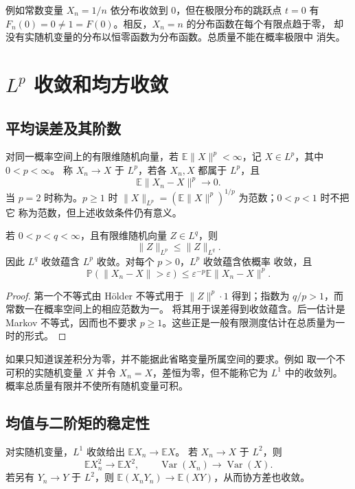 例如常数变量 $X_n=1/n$ 依分布收敛到 $0$，但在极限分布的跳跃点 $t=0$
有 $F_n(0)=0\ne1=F(0)$。相反，$X_n=n$ 的分布函数在每个有限点趋于零，
却没有实随机变量的分布以恒零函数为分布函数。总质量不能在概率极限中
消失。

\section{\texorpdfstring{$L^p$}{Lp} 收敛和均方收敛}
\label{sec:probability-lp-mean-square}

\subsection{平均误差及其阶数}

对同一概率空间上的有限维随机向量，若
$\mathbb E\|X\|^p<\infty$，记 $X\in L^p$，其中 $0<p<\infty$。
称 $X_n\to X$ 于 $L^p$，若各 $X_n,X$ 都属于 $L^p$，且
\[
 \mathbb E\|X_n-X\|^p\longrightarrow0.
\]
当 $p=2$ 时称为。$p\ge1$ 时
$\|X\|_{L^p}=(\mathbb E\|X\|^p)^{1/p}$ 为范数；$0<p<1$ 时不把它
称为范数，但上述收敛条件仍有意义。

\begin{proposition}
\label{prop:probability-lp-relations}
若 $0<p<q<\infty$，且有限维随机向量 $Z\in L^q$，则
\[
 \|Z\|_{L^p}\le\|Z\|_{L^q}.
\]
因此 $L^q$ 收敛蕴含 $L^p$ 收敛。对每个 $p>0$，$L^p$ 收敛蕴含依概率
收敛，且
\[
 \mathbb P(\|X_n-X\|>\varepsilon)
 \le\varepsilon^{-p}\mathbb E\|X_n-X\|^p.
\]
\end{proposition}

\begin{proof}
第一个不等式由 Hölder 不等式用于 $\|Z\|^p\cdot1$ 得到；指数为
$q/p>1$，而常数一在概率空间上的相应范数为一。
将其用于误差得到收敛蕴含。后一估计是 Markov 不等式，因而也不要求
$p\ge1$。这些正是一般有限测度估计在总质量为一时的形式。
\end{proof}

如果只知道误差积分为零，并不能据此省略变量所属空间的要求。例如
取一个不可积的实随机变量 $X$ 并令 $X_n=X$，差恒为零，但不能称它为
$L^1$ 中的收敛列。概率总质量有限并不使所有随机变量可积。

\subsection{均值与二阶矩的稳定性}

\begin{proposition}
\label{prop:mean-square-moment-continuity}
对实随机变量，$L^1$ 收敛给出 $\mathbb E X_n\to\mathbb E X$。
若 $X_n\to X$ 于 $L^2$，则
\[
 \mathbb E X_n^2\to\mathbb E X^2,
 \qquad\operatorname{Var}(X_n)\to\operatorname{Var}(X).
\]
若另有 $Y_n\to Y$ 于 $L^2$，则
$\mathbb E(X_nY_n)\to\mathbb E(XY)$，从而协方差也收敛。
\end{proposition}

